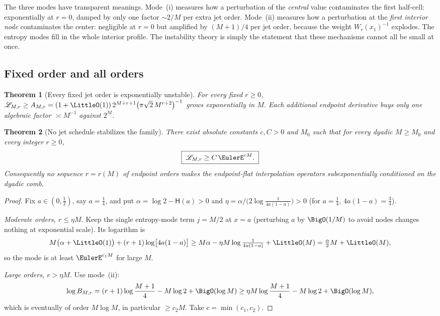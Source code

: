 \documentclass[11pt,oneside]{article}
\numberwithin{equation}{section}
\newtheorem{theorem}{Theorem}[section]
\theoremstyle{definition}
\theoremstyle{remark}
\newcommand{\Leb}{\mathscr L}
\newcommand{\Hyp}{\mathsf H}
\begin{document}
The three modes have transparent meanings.  Mode~(i) measures how a
perturbation of the \emph{central} value contaminates the first
half-cell: exponentially at $r=0$, damped by only one factor
$\sim2/M$ per extra jet order.  Mode~(ii) measures how a perturbation
at the \emph{first interior node} contaminates the center: negligible
at $r=0$ but amplified by $(M+1)/4$ per jet order, because the weight
$W_r(x_1)^{-1}$ explodes.  The entropy modes fill in the whole
interior profile.  The instability theory is simply the statement
that these mechanisms cannot all be small at once.

\subsection{Fixed order and all orders}

\begin{theorem}[Every fixed jet order is exponentially unstable]
\label{thm:fixed-r}
For every fixed $r\ge0$,
$\Leb_{M,r}\ge A_{M,r}
=(1+\LittleO(1))\,2^{M+r+1}\bigl(\pi\sqrt2\,M^{r+2}\bigr)^{-1}$
grows exponentially in $M$.  Each additional endpoint derivative
buys only one algebraic factor $\asymp M^{-1}$ against $2^{M}$.
\end{theorem}

\begin{theorem}[No jet schedule stabilizes the family]
\label{thm:all-r}
There exist absolute constants $c,C>0$ and $M_0$ such that for every
dyadic $M\ge M_0$ and \emph{every} integer $r\ge0$,
\begin{equation}
 \boxed{\;\Leb_{M,r}\ge C\,\EulerE^{cM}.\;}
 \label{eq:all-r}
\end{equation}
Consequently no sequence $r=r(M)$ of endpoint orders makes the
endpoint-flat interpolation operators subexponentially conditioned on
the dyadic comb.
\end{theorem}

\begin{proof}
Fix $a\in(0,\tfrac12)$, say $a=\tfrac14$, and put
$\alpha=\log2-\Hyp(a)>0$ and
$\eta=\alpha/\bigl(2\log\tfrac1{4a(1-a)}\bigr)>0$ (for
$a=\tfrac14$, $4a(1-a)=\tfrac34$).

\emph{Moderate orders, $r\le\eta M$.}  Keep the single entropy-mode
term $j=M/2$ at $x=a$ (perturbing $a$ by $\BigO(1/M)$ to avoid nodes
changes nothing at exponential scale).  Its logarithm is
\[
 M\bigl(\alpha+\LittleO(1)\bigr)
 +(r+1)\log\bigl[4a(1-a)\bigr]
 \ge M\alpha-\eta M\log\tfrac1{4a(1-a)}+\LittleO(M)
 =\tfrac{\alpha}2M+\LittleO(M),
\]
so the mode is at least $\EulerE^{c_1M}$ for large $M$.

\emph{Large orders, $r>\eta M$.}  Use mode~(ii):
\[
 \log B_{M,r}
 =(r+1)\log\frac{M+1}{4}-M\log2+\BigO(\log M)
 \ge \eta M\log\frac{M+1}{4}-M\log2+\BigO(\log M),
\]
which is eventually of order $M\log M$, in particular
$\ge c_2M$.  Take $c=\min(c_1,c_2)$.
\end{proof}
\end{document}
